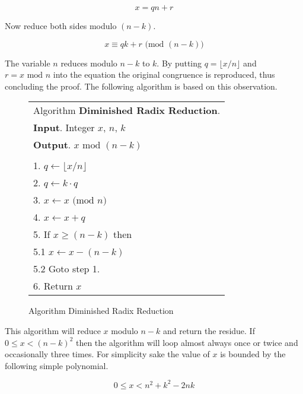 \documentclass[b5paper]{book}
\begin{document}
\begin{equation}
x = qn + r
\end{equation}

Now reduce both sides modulo $(n - k)$.

\begin{equation}
x \equiv qk + r  \mbox{ (mod }(n-k)\mbox{)}
\end{equation}

The variable $n$ reduces modulo $n - k$ to $k$.  By putting $q = \lfloor x/n \rfloor$ and $r = x \mbox{ mod } n$ 
into the equation the original congruence is reproduced, thus concluding the proof.  The following algorithm is based on this observation.

\begin{figure}[!here]
\begin{small}
\begin{center}
\begin{tabular}{l}
\hline Algorithm \textbf{Diminished Radix Reduction}. \\
\textbf{Input}.   Integer $x$, $n$, $k$ \\
\textbf{Output}.  $x \mbox{ mod } (n - k)$ \\
\hline \\
1.  $q \leftarrow \lfloor x / n \rfloor$ \\
2.  $q \leftarrow k \cdot q$ \\
3.  $x \leftarrow x \mbox{ (mod }n\mbox{)}$ \\
4.  $x \leftarrow x + q$ \\
5.  If $x \ge (n - k)$ then \\
\hspace{3mm}5.1  $x \leftarrow x - (n - k)$ \\
\hspace{3mm}5.2  Goto step 1. \\
6.  Return $x$ \\
\hline
\end{tabular}
\end{center}
\end{small}
\caption{Algorithm Diminished Radix Reduction}
\label{fig:DR}
\end{figure}

This algorithm will reduce $x$ modulo $n - k$ and return the residue.  If $0 \le x < (n - k)^2$ then the algorithm will loop almost always
once or twice and occasionally three times.  For simplicity sake the value of $x$ is bounded by the following simple polynomial.

\begin{equation} 
0 \le x < n^2 + k^2 - 2nk
\end{equation}
\end{document}
